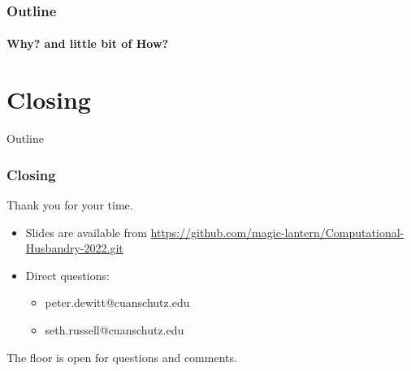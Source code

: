  
  \watermarkoff

  \begin{frame}[t,plain]
    \titlepage
  \end{frame}

  \begin{frame}[t]
    \frametitle{Outline}
    \framesubtitle{Why? and little bit of How?}
    \tableofcontents[hideallsubsections] 
  \end{frame}

   
  
  
  


  \section{Closing}
  \begin{frame}[t]{Outline}
  \end{frame}

  \begin{frame}[t] 
    \frametitle{Closing}
    \begin{center}
    Thank you for your time.
    \end{center}
    \vspace{0.25in}

    \begin{itemize}
      \item Slides are available from \url{https://github.com/magic-lantern/Computational-Husbandry-2022.git}
      \item Direct questions:
        \begin{itemize}
          \item peter.dewitt@cuanschutz.edu
          \item seth.russell@cuanschutz.edu
        \end{itemize}
    \end{itemize}

    \vspace{0.25in}
    \begin{center}
    The floor is open for questions and comments.
    \end{center} 
  \end{frame}



